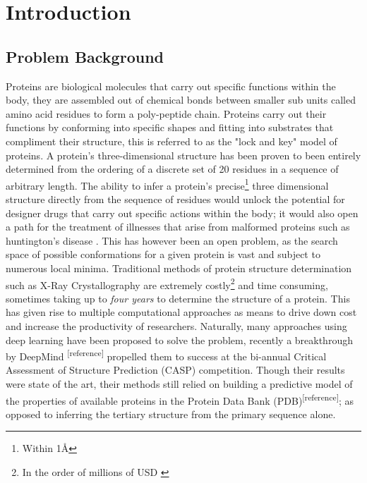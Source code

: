 
\chapter{Introduction}

\section{Problem Background}
   Proteins are biological molecules that carry out specific functions within the body,
   they are assembled out of chemical bonds between smaller sub units called amino acid residues
   to form a poly-peptide chain. Proteins carry out their functions 
   by conforming into specific shapes and fitting into substrates that compliment their structure,
   this is referred to as the "lock and key" model of proteins. A
   protein's three-dimensional structure has been proven \cite{Anfinsen} to been
   entirely determined from the ordering of a discrete set of 20 residues
   in a sequence of arbitrary length. The ability to infer a protein's precise\footnote{Within 1\AA}
   three dimensional structure directly from the sequence of residues would
   unlock the potential for designer drugs that carry out specific actions within the body;
   it would also open a path for the treatment of illnesses that arise from malformed
   proteins such as huntington's disease \cite{lesk}.
   This has however been an open problem, as the search space of possible conformations
   for a given protein is vast and subject to numerous local minima. Traditional
   methods of protein structure determination such as X-Ray Crystallography \cite{lesk}
   are extremely costly\footnote{In the order of millions of USD \cite{alberts}} and time
   consuming, sometimes taking up to \emph{four years} to determine the structure of a protein.
   This has given rise to multiple computational approaches \cite{Cymerman2008} as means
   to drive down cost and increase the productivity of researchers. 
   \linebreak
   Naturally, many approaches using deep learning have been proposed to solve the problem,
   recently a breakthrough by DeepMind \textsuperscript{[reference]} propelled them to success
   at the bi-annual Critical Assessment of Structure Prediction (CASP) competition. Though their
   results were state of the art, their methods still relied on building a predictive model of the
   properties of available proteins in the Protein Data Bank (PDB)\textsuperscript{[reference]}; as 
   opposed to inferring the tertiary structure from the primary sequence alone.
